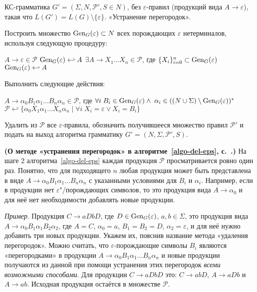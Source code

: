 {КС-грамматика $G'=(\Sigma, N, \mathcal P', S \in N)$, без
$\varepsilon$-правил (продукций вида $A \to \varepsilon$), такая что
$L(G')=L(G) \setminus \{ \varepsilon \}$.}
{«Устранение перегородок».}
{
  \item Построить множество $\operatorname{Gen}_G(\varepsilon) \subset N$ всех порождающих
  $\varepsilon$ нетерминалов, используя следующую процедуру:
  \begin{codebox}
  \li   \For $A \to \varepsilon \in \mathcal P$
  \zi   \Do
            $\operatorname{Gen}_G(\varepsilon) \hookleftarrow A$
        \End
  \li   \While $\exists A \to X_1 \ldots X_n \in \mathcal P$,
        где $\{ X_i \}_{i=0}^n \subset \operatorname{Gen}_G(\varepsilon)$
  \zi       \Do
            $\operatorname{Gen}_G(\varepsilon) \hookleftarrow A$
            \End
        \End
  \end{codebox}
  \item\label{remove-barriers} Выполнить следующие действия:
  \begin{codebox}
  \zi \For $A \to \alpha_0 B_1 \alpha_1 \ldots B_n \alpha_n \in \mathcal P$, где
  $\forall i \; B_i \in \operatorname{Gen}_G(\varepsilon) \wedge \;
  \alpha_i \in ((N \cup \Sigma) \setminus \operatorname{Gen}_G(\varepsilon))^*$
  \zi   \Do
        $\mathcal P \hookleftarrow
            \{ \alpha_0 X_1 \alpha_1 \ldots X_n \alpha_n \mid
            \forall i \; X_i = \varepsilon \vee X_i = B_i \}$
        \End
  \end{codebox}
  \item Удалить из $\mathcal P$ все $\varepsilon$-правила, обозначить
  получившееся множество правил $\mathcal P'$ и подать на выход алгоритма
  грамматику $G' = (N, \Sigma, \mathcal P', S)$.
}

\begin{myremark}
\textup{\textbf{(О методе «устранения перегородок» в алгоритме~\ref{algo-del-eps}, с.~\pageref{algo-del-eps}.)}}
На шаге 2 алгоритма~\ref{algo-del-eps} каждая 
продукция $\mathcal P$ просматривается ровно
один раз. Понятно, что для подходящего $n$ любая продукция может быть
представлена в виде $A \to \alpha_0 B_1 \alpha_1 \ldots B_n \alpha_n$ с
указанными условиями для $B_i$ и $\alpha_i$. Например, если в продукции нет
$\varepsilon$"/порождающих символов, то это продукция вида $A \to
\alpha_0$ и для неё нет необходимости добавлять новые продукции.

\emph{Пример}. Продукция $C \to aDbD$, где $D \in \operatorname{Gen}_G(\varepsilon)$, $a, b \in
\Sigma$, это продукция вида $A \to \alpha_0 B_1 \alpha_1 B_2 \alpha_2$, где $A =
C$, $\alpha_0 = a$, $B_1 = B_2 = D$, $\alpha_2 = \varepsilon$, и для неё нужно
добавить три новых продукции. Укажем их, пояснив название метода «удаления
перегородок». Можно считать, что $\varepsilon$-порождающие символы $B_i$ являются
«перегородками» в продукции $A \to \alpha_0 B_1 \alpha_1 \ldots B_n \alpha_n$ и
новые продукции получаются из данной при помощи устранения этих перегородок \emph{всеми
возможными способами}. Для продукции $C \to aDbD$ это: $C \to abD$, $A \to aDb$ и
$A \to ab$. Исходная продукция остаётся в множестве $\mathcal P$.
\end{myremark}

